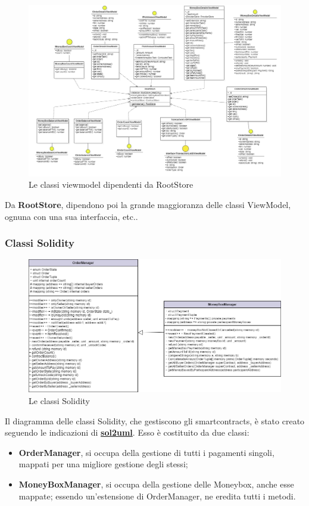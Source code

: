 \begin{landscape}
\begin{figure}[H]
    \centering
    \includegraphics[scale = 0.6]{immagini/rsviewmodel.png}
    \caption{Le classi viewmodel dipendenti da RootStore}
\end{figure}
\end{landscape}

Da \textbf{RootStore}, dipendono poi la grande maggioranza delle classi ViewModel, ognuna con una sua interfaccia, etc..

\subsubsection{Classi Solidity}

\begin{figure}[H]
    \centering
    \includegraphics[scale = 0.5]{immagini/smartcontract.png}
    \caption{Le classi Solidity}
\end{figure}

Il diagramma delle classi Solidity, che gestiscono gli smartcontracts, è stato creato seguendo le indicazioni di \href{https://github.com/naddison36/sol2uml}{\textbf{sol2uml}}.
Esso è costituito da due classi:
\begin{itemize}
    \item \textbf{OrderManager}, si occupa della gestione di tutti i pagamenti singoli, mappati per una migliore gestione degli stessi;
    \item \textbf{MoneyBoxManager}, si occupa della gestione delle Moneybox, anche esse mappate; essendo un'estensione di OrderManager, ne eredita tutti i metodi.
\end{itemize}

